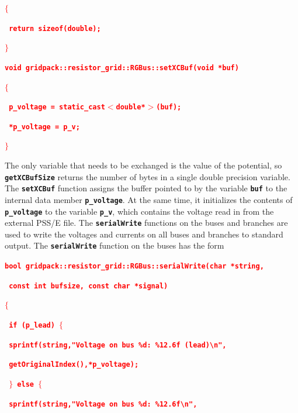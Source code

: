 \documentclass[12pt]{report} %
\begin{document}
\textcolor{red}{\texttt{\textbf{$\boldsymbol{\mathrm{\{}}$}}}

\textcolor{red}{\texttt{\textbf{  return sizeof(double);}}}

\textcolor{red}{\texttt{\textbf{$\boldsymbol{\mathrm{\}}}$}}}

\textcolor{red}{\texttt{\textbf{void gridpack::resistor\_grid::RGBus::setXCBuf(void *buf)}}}

\textcolor{red}{\texttt{\textbf{$\boldsymbol{\mathrm{\{}}$}}}

\textcolor{red}{\texttt{\textbf{  p\_voltage = static\_cast$\boldsymbol{\mathrm{<}}$double*$\boldsymbol{\mathrm{>}}$(buf);}}}

\textcolor{red}{\texttt{\textbf{  *p\_voltage = p\_v;}}}

\textcolor{red}{\texttt{\textbf{$\boldsymbol{\mathrm{\}}}$}}}

The only variable that needs to be exchanged is the value of the potential, so \texttt{\textbf{getXCBufSize}} returns the number of bytes in a single double precision variable. The \texttt{\textbf{setXCBuf}} function assigns the buffer pointed to by the variable \texttt{\textbf{buf}} to the internal data member \texttt{\textbf{p\_voltage}}. At the same time, it initializes the contents of \texttt{\textbf{p\_voltage}} to the variable \texttt{\textbf{p\_v}}, which contains the voltage read in from the external PSS/E file.
The \texttt{\textbf{serialWrite}} functions on the buses and branches are used to write the voltages and currents on all buses and branches to standard output. The \texttt{\textbf{serialWrite}} function on the buses has the form

\textcolor{red}{\texttt{\textbf{bool gridpack::resistor\_grid::RGBus::serialWrite(char *string,}}}

\textcolor{red}{\texttt{\textbf{    const int bufsize, const char *signal)}}}

\textcolor{red}{\texttt{\textbf{$\boldsymbol{\mathrm{\{}}$}}}

\textcolor{red}{\texttt{\textbf{  if (p\_lead) $\boldsymbol{\mathrm{\{}}$}}}

\textcolor{red}{\texttt{\textbf{    sprintf(string,"Voltage on bus \%d: \%12.6f (lead){\textbackslash}n",}}}

\textcolor{red}{\texttt{\textbf{        getOriginalIndex(),*p\_voltage);}}}

\textcolor{red}{\texttt{\textbf{  $\boldsymbol{\mathrm{\}}}$ else $\boldsymbol{\mathrm{\{}}$}}}

\textcolor{red}{\texttt{\textbf{    sprintf(string,"Voltage on bus \%d: \%12.6f{\textbackslash}n",}}}
\end{document}
